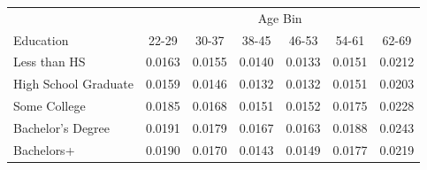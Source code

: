\begin{tabular}{lcccccc}
\hline\hline
 & \multicolumn{6}{c}{Age Bin} \\
Education & 22-29 & 30-37 & 38-45 & 46-53 & 54-61 & 62-69 \\
\hline
Less than HS&0.0163&0.0155&0.0140&0.0133&0.0151&0.0212\\
High School Graduate&0.0159&0.0146&0.0132&0.0132&0.0151&0.0203\\
Some College&0.0185&0.0168&0.0151&0.0152&0.0175&0.0228\\
Bachelor's Degree&0.0191&0.0179&0.0167&0.0163&0.0188&0.0243\\
Bachelors+&0.0190&0.0170&0.0143&0.0149&0.0177&0.0219\\
\hline\hline
\end{tabular}
